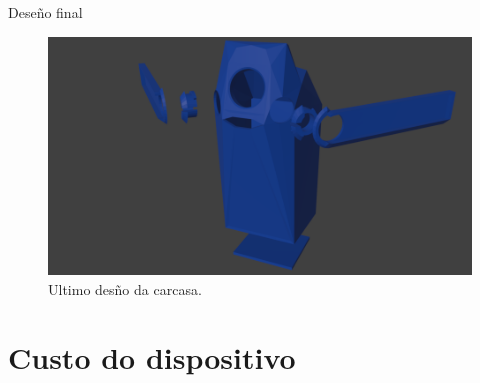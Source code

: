 \begin{itemize}
    Deseño final
    \begin{figure}[tb]
      \centering
      \includegraphics[scale=.4]{imaxes/carcasa.png}
      \caption{Ultimo desño da carcasa.}
      \label{f:carcasa}
    \end{figure}
    \section{Custo do dispositivo}

\end{itemize}
